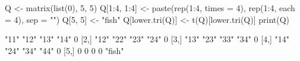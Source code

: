 \begin{Schunk}
\begin{Sinput}
 Q <- matrix(list(0), 5, 5)
 Q[1:4, 1:4] <- paste(rep(1:4, times = 4), rep(1:4, each = 4), sep = "")
 Q[5, 5] <- "fish"
 Q[lower.tri(Q)] <- t(Q)[lower.tri(Q)]
 print(Q)
\end{Sinput}
\begin{Soutput}
     [,1] [,2] [,3] [,4] [,5]  
[1,] "11" "12" "13" "14" 0     
[2,] "12" "22" "23" "24" 0     
[3,] "13" "23" "33" "34" 0     
[4,] "14" "24" "34" "44" 0     
[5,] 0    0    0    0    "fish"
\end{Soutput}
\end{Schunk}

